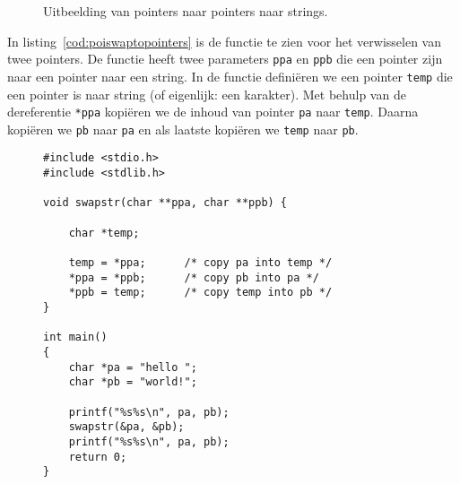 \begin{figure}[!ht]
\centering
{}
\caption{Uitbeelding van pointers naar pointers naar strings.}
\label{fig:poipointertopointerstring}
\end{figure}

In listing~\ref{cod:poiswaptopointers} is de functie te zien voor het verwisselen van twee pointers. De functie heeft twee parameters \texttt{ppa} en \texttt{ppb} die een pointer zijn naar een pointer naar een string. In de functie definiëren we een pointer \texttt{temp} die een pointer is naar string (of eigenlijk: een karakter). Met behulp van de dereferentie \texttt{*ppa} kopiëren we de inhoud van pointer \texttt{pa} naar \texttt{temp}. Daarna kopiëren we \texttt{pb} naar \texttt{pa} en als laatste kopiëren we \texttt{temp} naar \texttt{pb}.

\begin{figure}[!ht]
\begin{lstlisting}[caption=Functie voor het verwisselen van twee pointers.,label=cod:poiswaptopointers]
#include <stdio.h>
#include <stdlib.h>

void swapstr(char **ppa, char **ppb) {

	char *temp;

    temp = *ppa;      /* copy pa into temp */
    *ppa = *ppb;      /* copy pb into pa */
    *ppb = temp;      /* copy temp into pb */
}

int main()
{
    char *pa = "hello ";
    char *pb = "world!";

    printf("%s%s\n", pa, pb);
    swapstr(&pa, &pb);
    printf("%s%s\n", pa, pb);
    return 0;
}
\end{lstlisting}
\end{figure}

